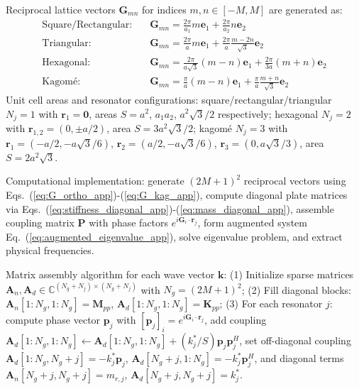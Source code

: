 \documentclass[review,numbers,sort&compress]{elsarticle}
\begin{document}
{Reciprocal lattice vectors $\mathbf{G}_{mn}$ for indices $m, n \in [-M, M]$ are generated as:
\begin{align}
\text{Square/Rectangular:} \quad &\mathbf{G}_{mn} = \frac{2\pi}{a_1}m\mathbf{e}_1 + \frac{2\pi}{a_2}n\mathbf{e}_2 \label{eq:G_ortho_app}\\
\text{Triangular:} \quad &\mathbf{G}_{mn} = \frac{2\pi}{a}m\mathbf{e}_1 + \frac{2\pi}{a}\frac{m-2n}{\sqrt{3}}\mathbf{e}_2 \label{eq:G_tri_app}\\
\text{Hexagonal:} \quad &\mathbf{G}_{mn} = \frac{2\pi}{a\sqrt{3}}(m-n)\mathbf{e}_1 + \frac{2\pi}{3a}(m+n)\mathbf{e}_2 \label{eq:G_hex_app}\\
\text{Kagomé:} \quad &\mathbf{G}_{mn} = \frac{\pi}{a}(m-n)\mathbf{e}_1 + \frac{\pi}{a}\frac{m+n}{\sqrt{3}}\mathbf{e}_2 \label{eq:G_kag_app}
\end{align}
Unit cell areas and resonator configurations: square/rectangular/triangular $N_j = 1$ with $\mathbf{r}_1 = \mathbf{0}$, areas $S = a^2$, $a_1 a_2$, $a^2\sqrt{3}/2$ respectively; hexagonal $N_j = 2$ with $\mathbf{r}_{1,2} = (0, \pm a/2)$, area $S = 3a^2\sqrt{3}/2$; kagomé $N_j = 3$ with $\mathbf{r}_1 = (-a/2, -a\sqrt{3}/6)$, $\mathbf{r}_2 = (a/2, -a\sqrt{3}/6)$, $\mathbf{r}_3 = (0, a\sqrt{3}/3)$, area $S = 2a^2\sqrt{3}$.

Computational implementation: generate $(2M+1)^2$ reciprocal vectors using Eqs.~(\ref{eq:G_ortho_app})-(\ref{eq:G_kag_app}), compute diagonal plate matrices via Eqs.~(\ref{eq:stiffness_diagonal_app})-(\ref{eq:mass_diagonal_app}), assemble coupling matrix $\mathbf{P}$ with phase factors $e^{i\mathbf{G}_i \cdot \mathbf{r}_j}$, form augmented system Eq.~(\ref{eq:augmented_eigenvalue_app}), solve eigenvalue problem, and extract physical frequencies.

Matrix assembly algorithm for each wave vector $\mathbf{k}$: (1) Initialize sparse matrices $\mathbf{A}_n, \mathbf{A}_d \in \mathbb{C}^{(N_g+N_j) \times (N_g+N_j)}$ with $N_g = (2M+1)^2$; (2) Fill diagonal blocks: $\mathbf{A}_n[1:N_g, 1:N_g] = \mathbf{M}_{pp}$, $\mathbf{A}_d[1:N_g, 1:N_g] = \mathbf{K}_{pp}$; (3) For each resonator $j$: compute phase vector $\mathbf{p}_j$ with $[\mathbf{p}_j]_i = e^{i\mathbf{G}_i \cdot \mathbf{r}_j}$, add coupling $\mathbf{A}_d[1:N_g, 1:N_g] \leftarrow \mathbf{A}_d[1:N_g, 1:N_g] + (k_j^*/S)\mathbf{p}_j\mathbf{p}_j^H$, set off-diagonal coupling $\mathbf{A}_d[1:N_g, N_g+j] = -k_j^*\mathbf{p}_j$, $\mathbf{A}_d[N_g+j, 1:N_g] = -k_j^*\mathbf{p}_j^H$, and diagonal terms $\mathbf{A}_n[N_g+j, N_g+j] = m_{r,j}$, $\mathbf{A}_d[N_g+j, N_g+j] = k_j^*$.

}
\end{document}
